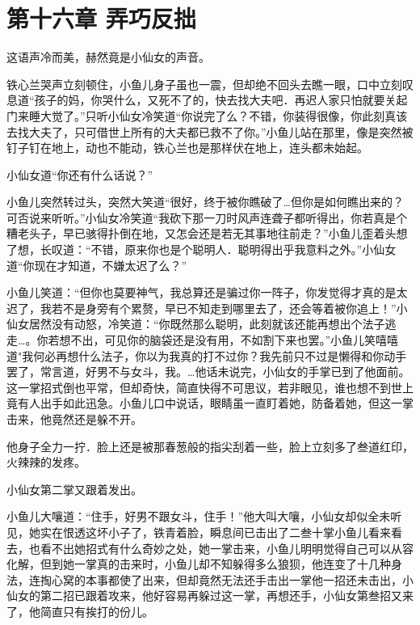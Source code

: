 \documentclass[12pt,oneside]{book}
\begin{document}
\hypertarget{ux7b2cux5341ux516dux7ae0-ux5f04ux5de7ux53cdux62d9}{%
\chapter{第十六章
弄巧反拙}\label{ux7b2cux5341ux516dux7ae0-ux5f04ux5de7ux53cdux62d9}}

这语声冷而美，赫然竟是小仙女的声音。

铁心兰哭声立刻顿住，小鱼儿身子虽也一震，但却绝不回头去瞧一眼，口中立刻叹息道``孩子的妈，你哭什么，又死不了的，快去找大夫吧．再迟人家只怕就要关起门来睡大觉了。''只听小仙女冷笑道``你说完了么？不错，你装得很像，你此刻真该去找大夫了，只可借世上所有的大夫都已救不了你。''小鱼儿站在那里，像是突然被钉子钉在地上，动也不能动，铁心兰也是那样伏在地上，连头都未始起。

小仙女道``你还有什么话说？''

小鱼儿突然转过头，突然大笑道``很好，终于被你瞧破了\ldots 但你是如何瞧出来的？可否说来听听。''小仙女冷笑道``我砍下那一刀时风声连聋子都听得出，你若真是个糟老头子，早已骇得扑倒在地，又怎会还是若无其事地往前走？''小鱼儿歪着头想了想，长叹道：``不错，原来你也是个聪明人．聪明得出乎我意料之外。''小仙女道``你现在才知道，不嫌太迟了么？''

小鱼儿笑道：``但你也莫要神气，我总算还是骗过你一阵子，你发觉得才真的是太迟了，我若不是身旁有个累赘，早已不知走到哪里去了，还会等着被你追上！''小仙女居然没有动怒，冷笑道：``你既然那么聪明，此刻就该还能再想出个法子逃走\ldots。你若想不出，可见你的脑袋还是没有用，不如割下来也罢。''小鱼儿笑嘻嘻道"我何必再想什么法子，你以为我真的打不过你？我先前只不过是懒得和你动手罢了，常言道，好男不与女斗，我。\ldots 他话未说完，小仙女的手掌已到了他面前。这一掌招式倒也平常，但却奇快，简直快得不可思议，若非眼见，谁也想不到世上竟有人出手如此迅急。小鱼儿口中说话，眼睛虽一直盯着她，防备着她，但这一掌击来，他竟然还是躲不开。

他身子全力一拧．脸上还是被那春葱般的指尖刮着一些，脸上立刻多了叁道红印，火辣辣的发疼。

小仙女第二掌又跟着发出。

小鱼儿大嚷道：``住手，好男不跟女斗，住手！''他大叫大嚷，小仙女却似全未听见，她实在恨透这坏小子了，铁青着脸，瞬息间已击出了二叁十掌小鱼儿看来看去，也看不出她招式有什么奇妙之处，她一掌击来，小鱼儿明明觉得自己可以从容化解，但到她一掌真的击来时，小鱼儿却不知躲得多么狼狈，他连变了十几种身法，连掏心窝的本事都使了出来，但却竟然无法还手击出一掌他一招还未击出，小仙女的第二招已跟着攻来，他好容易再躲过这一掌，再想还手，小仙女第叁招又来了，他简直只有挨打的份儿。
\end{document}
